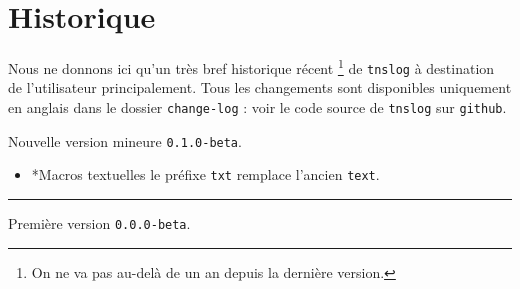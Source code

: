 \documentclass[12pt,a4paper]{article}
\makeatletter
\theoremstyle{definition}
\newcommand\separation{
	\medskip
	\hfill\rule{0.5\textwidth}{0.75pt}\hfill
	\medskip
}
\newcommand\topic{\@ifstar{\@topic@star}{\@topic@no@star}}
\newcommand\@topic@no@star[1]{%
	\textbf{\textsc{#1}.}%
}
\newcommand\@topic@star[1]{%
	\textbf{\textsc{#1} :}%
}
\makeatother
\begin{document}
\begin{center}
\end{center}
\newpage

\section{Historique}

Nous ne donnons ici qu'un très bref historique récent
\footnote{
	On ne va pas au-delà de un an depuis la dernière version.
}
de \verb+tnslog+ à destination de l'utilisateur principalement.
Tous les changements sont disponibles uniquement en anglais dans le dossier \verb+change-log+ : voir le code source de \verb+tnslog+ sur \verb+github+.

\begin{description}

    \medskip
    \item[2020-08-08] Nouvelle version mineure \verb+0.1.0-beta+.
    
    \begin{itemize}[itemsep=.5em]
        \item \topic*{Macros \og textuelles \fg}
              le préfixe \verb#txt# remplace l'ancien \verb#text#.
    \end{itemize}
    
    
    \separation

    \medskip
    \item[2020-07-10] Première version \verb+0.0.0-beta+.

\end{description}
\end{document}
